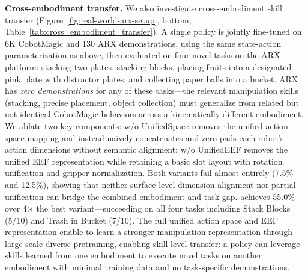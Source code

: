 \textbf{Cross-embodiment transfer.}
We also investigate cross-embodiment skill transfer (Figure~\ref{fig:real-world-arx-setup}, bottom; Table~\ref{tab:cross_embodiment_transfer}). 
A single policy is jointly fine-tuned on 6K CobotMagic and 130 ARX demonstrations, using the same state-action parameterization as above, then evaluated on four novel tasks on the ARX platform: stacking two plates, stacking blocks, placing fruits into a designated pink plate with distractor plates, and collecting paper balls into a bucket. 
ARX has \emph{zero demonstrations} for any of these tasks---the relevant manipulation skills (stacking, precise placement, object collection) must generalize from related but not identical CobotMagic behaviors across a kinematically different embodiment. 
We ablate two key components: \ours w/o UnifiedSpace removes the unified action-space mapping and instead naively concatenates and zero-pads each robot's action dimensions without semantic alignment; \ours w/o UnifiedEEF removes the unified EEF representation while retaining a basic slot layout with rotation unification and gripper normalization. 
Both variants fail almost entirely (7.5\% and 12.5\%), showing that neither surface-level dimension alignment nor partial unification can bridge the combined embodiment and task gap. 
\ours achieves 55.0\%---over 4$\times$ the best variant---succeeding on all four tasks including Stack Blocks (5/10) and Trash in Bucket (7/10). 
The full unified action space and EEF representation enable \ours to learn a stronger manipulation representation through large-scale diverse pretraining, enabling skill-level transfer: a policy can leverage skills learned from one embodiment to execute novel tasks on another embodiment with minimal training data and no task-specific demonstrations.





